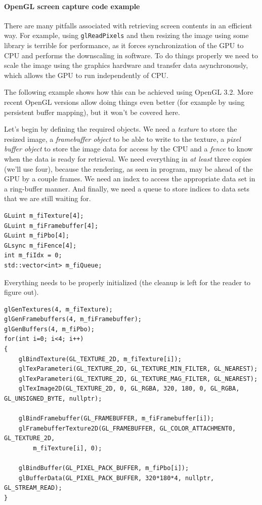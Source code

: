 \documentclass[hidelinks,titlepage,a4paper]{article}
\begin{document}
\paragraph{OpenGL screen capture code example}
\label{screenshotcode}

There are many pitfalls associated with retrieving screen contents in an efficient way. For example, using \texttt{glReadPixels} and then resizing the image using some library is terrible for performance, as it forces synchronization of the GPU to CPU and performs the downscaling in software. To do things properly we need to scale the image using the graphics hardware and transfer data asynchronously, which allows the GPU to run independently of CPU.

The following example shows how this can be achieved using OpenGL 3.2. More recent OpenGL versions allow doing things even better (for example by using persistent buffer mapping), but it won't be covered here.

Let's begin by defining the required objects. We need a \emph{texture} to store the resized image, a \emph{framebuffer object} to be able to write to the texture, a \emph{pixel buffer object} to store the image data for access by the CPU and a \emph{fence} to know when the data is ready for retrieval. We need everything in \emph{at least} three copies (we'll use four), because the rendering, as seen in program, may be ahead of the GPU by a couple frames. We need an index to access the appropriate data set in a ring-buffer manner. And finally, we need a queue to store indices to data sets that we are still waiting for.

\begin{lstlisting}
GLuint m_fiTexture[4];
GLuint m_fiFramebuffer[4];
GLuint m_fiPbo[4];
GLsync m_fiFence[4];
int m_fiIdx = 0;
std::vector<int> m_fiQueue;
\end{lstlisting}

Everything needs to be properly initialized (the cleanup is left for the reader to figure out).

\begin{lstlisting}
glGenTextures(4, m_fiTexture);
glGenFramebuffers(4, m_fiFramebuffer);
glGenBuffers(4, m_fiPbo);
for(int i=0; i<4; i++)
{
    glBindTexture(GL_TEXTURE_2D, m_fiTexture[i]);
    glTexParameteri(GL_TEXTURE_2D, GL_TEXTURE_MIN_FILTER, GL_NEAREST);
    glTexParameteri(GL_TEXTURE_2D, GL_TEXTURE_MAG_FILTER, GL_NEAREST);
    glTexImage2D(GL_TEXTURE_2D, 0, GL_RGBA, 320, 180, 0, GL_RGBA, GL_UNSIGNED_BYTE, nullptr);

    glBindFramebuffer(GL_FRAMEBUFFER, m_fiFramebuffer[i]);
    glFramebufferTexture2D(GL_FRAMEBUFFER, GL_COLOR_ATTACHMENT0, GL_TEXTURE_2D,
		m_fiTexture[i], 0);

    glBindBuffer(GL_PIXEL_PACK_BUFFER, m_fiPbo[i]);
    glBufferData(GL_PIXEL_PACK_BUFFER, 320*180*4, nullptr, GL_STREAM_READ);
}
\end{lstlisting}
\end{document}
